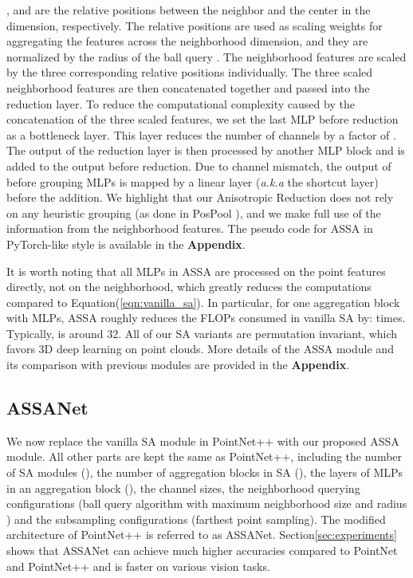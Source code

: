\documentclass{article}
\newcommand{\eqnLabel}{Equation\xspace}
\newcommand{\eqnref}[1]{(\ref{#1})}
\newcommand{\secLabel}{Section\xspace}
\newcommand{\supp}{\textbf{Appendix}\xspace}
\begin{document}
,  and  are the relative positions between the neighbor  and the center  in the  dimension, respectively. The relative positions are used as scaling weights for aggregating the features across the neighborhood dimension, and they are normalized by the radius of the ball query . The neighborhood features are scaled by the three corresponding relative positions individually. The three scaled neighborhood features are then concatenated together and passed into the reduction layer.
To reduce the computational complexity caused by the concatenation of the three scaled features, we set the last MLP before reduction as a bottleneck layer. This layer reduces the number of channels by a factor of . The output of the reduction layer is then processed by another MLP block and is added to the output before reduction. Due to channel mismatch, the output of before grouping MLPs is mapped by a linear layer  (\textit{a.k.a} the shortcut layer) before the addition. We highlight that our Anisotropic Reduction does not rely on any heuristic grouping (as done in PosPool \cite{Liu2020ACL}), and we make full use of the information from the neighborhood features. The pseudo code for ASSA in PyTorch-like style is available in the \supp. 

It is worth noting that all MLPs in ASSA are processed on the point features directly, not on the neighborhood, which greatly reduces the computations compared to \eqnLabel \eqnref{eqn:vanilla_sa}. 
In particular, for one aggregation block with  MLPs, ASSA roughly reduces the FLOPs consumed in vanilla SA by:  times. Typically,  is around 32. All of our SA variants are permutation invariant, which favors 3D deep learning on point clouds. More details of the ASSA module and its comparison with previous modules are provided in the \supp. 


\subsection{ASSANet}
We now replace the vanilla SA module in PointNet++ \cite{Qi2017PointNetDH} with our proposed ASSA module. All other parts are kept the same as PointNet++, including the number of SA modules (), the number of aggregation blocks in SA (), the layers of MLPs in an aggregation block (), the channel sizes, the neighborhood querying configurations (ball query algorithm with maximum neighborhood size  and radius ) and the subsampling configurations (farthest point sampling). The modified architecture of PointNet++ is referred to as ASSANet. \secLabel \ref{sec:experiments} shows that ASSANet can achieve much higher accuracies compared to PointNet and PointNet++ and is faster on various vision tasks.
\end{document}
